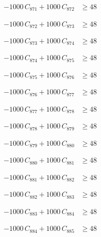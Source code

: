 \documentclass[a4paper,11pt]{article}
\begin{document}
\begin{align}
-1000\,C_{871} + 1000\,C_{872} &\geq 48 \nonumber
\end{align}

\begin{align}
-1000\,C_{872} + 1000\,C_{873} &\geq 48 \nonumber
\end{align}

\begin{align}
-1000\,C_{873} + 1000\,C_{874} &\geq 48 \nonumber
\end{align}

\begin{align}
-1000\,C_{874} + 1000\,C_{875} &\geq 48 \nonumber
\end{align}

\begin{align}
-1000\,C_{875} + 1000\,C_{876} &\geq 48 \nonumber
\end{align}

\begin{align}
-1000\,C_{876} + 1000\,C_{877} &\geq 48 \nonumber
\end{align}

\begin{align}
-1000\,C_{877} + 1000\,C_{878} &\geq 48 \nonumber
\end{align}

\begin{align}
-1000\,C_{878} + 1000\,C_{879} &\geq 48 \nonumber
\end{align}

\begin{align}
-1000\,C_{879} + 1000\,C_{880} &\geq 48 \nonumber
\end{align}

\begin{align}
-1000\,C_{880} + 1000\,C_{881} &\geq 48 \nonumber
\end{align}

\begin{align}
-1000\,C_{881} + 1000\,C_{882} &\geq 48 \nonumber
\end{align}

\begin{align}
-1000\,C_{882} + 1000\,C_{883} &\geq 48 \nonumber
\end{align}

\begin{align}
-1000\,C_{883} + 1000\,C_{884} &\geq 48 \nonumber
\end{align}

\begin{align}
-1000\,C_{884} + 1000\,C_{885} &\geq 48 \nonumber
\end{align}
\end{document}
